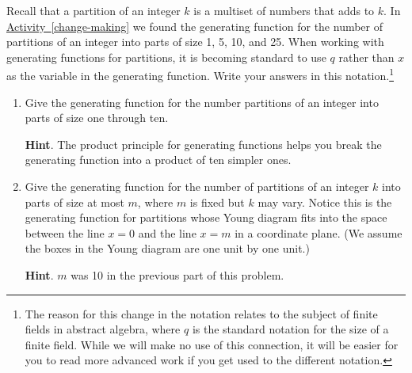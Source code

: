 \documentclass{book}
\begin{document}
\setcounter{cpjt}{317}
\addtocounter{cpjt}{-1}
\begin{activity}\label{activity-310}
\hypertarget{p-1567}{}%
Recall that a partition of an integer \(k\) is a multiset of numbers that adds to \(k\). In \hyperref[change-making]{Activity~\ref{change-making}} we found the generating function for the number of partitions of an integer into parts of size 1, 5, 10, and 25. When working with generating functions for partitions, it is becoming standard to use \(q\) rather than \(x\) as the variable in the generating function.  Write your answers in this notation.\footnote{The reason for this change in the notation relates to the subject of finite fields in abstract algebra, where \(q\) is the standard notation for the size of a finite field.  While we will make no use of this connection, it will be easier for you to read more advanced work if you get used to the different notation.\label{fn-20}}%
\begin{enumerate}[font=\bfseries,label=(\alph*),ref=\alph*]
\item\label{task-269} \hypertarget{p-1568}{}%
Give the generating function for the number partitions of an integer into parts of size one through ten.%
\par\smallskip%
\noindent\textbf{Hint}.\hypertarget{hint-205}{}\quad%
\hypertarget{p-1569}{}%
The product principle for generating functions helps you break the generating function into a product of ten simpler ones.%
\par\smallskip%
\noindent\item\label{largestpartatmostm} \hypertarget{p-1571}{}%
Give the generating function for the number of partitions of an integer \(k\) into parts of size at most \(m\), where \(m\) is fixed but \(k\) may vary. Notice this is the generating function for partitions whose Young diagram fits into the space between the line \(x=0\) and the line \(x=m\) in a coordinate plane. (We assume the boxes in the Young diagram are one unit by one unit.)%
\par\smallskip%
\noindent\textbf{Hint}.\hypertarget{hint-206}{}\quad%
\hypertarget{p-1572}{}%
\(m\) was 10 in the previous part of this problem.%
\par\smallskip%
\noindent\end{enumerate}
\end{activity}

\clearpage
\end{document}
